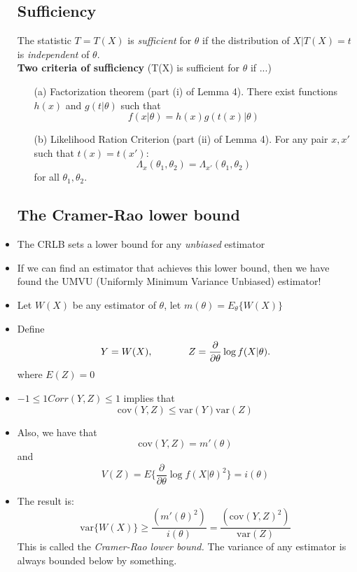 \documentclass[12pt]{report} \addtolength{\textheight}{2in}
\newcommand{\cov}{\text{cov}}
\newcommand{\var}{\text{var}}
\begin{document}
\begin{itemize}
\subsection*{Sufficiency}
The statistic $T=T(X)$ is \textit{sufficient} for $\theta$ if the distribution of $X| T(X)=t$ is \textit{independent} of $\theta.$\\
\vspace{.1in}
\textbf{Two criteria of sufficiency}  (T(X) is sufficient for $\theta$ if ...)
\begin{itemize}
\item[(a)] Factorization theorem (part (i) of Lemma 4). There exist functions $h(x)$ and $g(t|\theta)$ such that 
\begin{displaymath}
f(x|\theta)={h(x)}{g(t(x)|\theta)}
\end{displaymath}
\item[(b)] Likelihood Ration Criterion  (part (ii) of Lemma 4). For any pair $x, x'$ such that $t(x)=t(x'):$
\begin{displaymath}
\Lambda_x(\theta_1,\theta_2)=\Lambda_{x'}(\theta_1,\theta_2)
\end{displaymath}
for all $\theta_1, \theta_2.$

\end{itemize}
\subsection*{The Cramer-Rao lower bound}
\item The CRLB sets a lower bound for any \textit{unbiased} estimator
\item If we can find an estimator that achieves this lower bound, then we have found the UMVU (Uniformly Minimum Variance Unbiased) estimator!
\item Let $W(X)$ be any estimator of $\theta$, let $m(\theta)= E_{\theta}\{W(X)\}$
\item Define
\begin{displaymath}
Y=W(X), \hspace{.5in} Z= \frac{\partial}{\partial \theta} \log f(X| \theta).
\end{displaymath}
where $E(Z)=0$
\item $-1\leq1 Corr(Y,Z) \leq 1 $ implies that 
\begin{displaymath}
\cov(Y,Z) \leq \var(Y)\var(Z)
\end{displaymath}
\item Also, we have that
\begin{displaymath}
\cov(Y,Z) = m'(\theta)
\end{displaymath}
and 
\begin{displaymath}
V(Z)=E\{\frac{\partial}{\partial \theta} \log f(X| \theta)^2\} = i(\theta)
\end{displaymath}
\item The result is:
\begin{displaymath}
\boxed
{
\var\{W(X)\} \geq \frac{(m'(\theta)^2)}{i(\theta)} =\frac{(\cov(Y,Z)^2)}{\var(Z)} 
}
\end{displaymath}
This is called the \textit{Cramer-Rao lower bound.} The variance of any estimator is always bounded below  by something.


\end{itemize}
\end{document}
